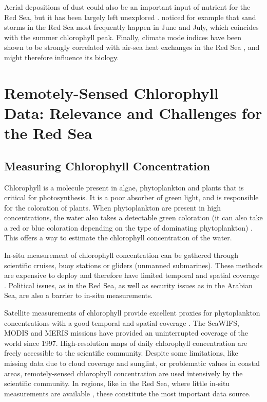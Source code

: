 Aerial depositions of dust could also be an important input of nutrient for the Red Sea, but it has been largely left unexplored \cite{Triantafyllou2014}. \cite{Raitsos2013} noticed for example that sand storms in the Red Sea most frequently happen in June and July, which coincides with the summer chlorophyll peak. Finally, climate mode indices have been shown to be strongly correlated with air-sea heat exchanges in the Red Sea \cite{Abulnaja2015}, and might therefore influence its biology.

\section{Remotely-Sensed Chlorophyll Data: Relevance and Challenges for the Red
Sea}

\subsection{Measuring Chlorophyll Concentration}

Chlorophyll is a molecule present in algae, phytoplankton and plants that is critical for photosynthesis. It is a poor absorber of green light, and is responsible for the coloration of plants. When phytoplankton are present in high concentrations, the water also takes a detectable green coloration (it can also take a red or blue coloration depending on the type of dominating phytoplankton) \cite{Robinson2010}. This offers a way to estimate the chlorophyll concentration of the water.

In-situ measurement of chlorophyll concentration can be gathered through scientific cruises, buoy stations or gliders (unmanned submarines). These methods are expensive to deploy and therefore have limited temporal and spatial coverage \cite{Robinson2010}. Political issues, as in the Red Sea, as well as security issues as in the Arabian Sea, are also a barrier to in-situ measurements.

Satellite measurements of chlorophyll provide excellent proxies for phytoplankton concentrations with a good temporal and spatial coverage \cite{Robinson2010}. The SeaWIFS, MODIS and MERIS missions have provided an uninterrupted coverage of the world since 1997. High-resolution maps of daily chlorophyll concentration are freely accessible to the scientific community. Despite some limitations, like missing data due to cloud coverage and sunglint, or problematic values in coastal areas, remotely-sensed chlorophyll concentration are used intensively by the scientific community. In regions, like in the Red Sea, where little in-situ measurements are available \cite{Raitsos2013}, these constitute the most important data source.

